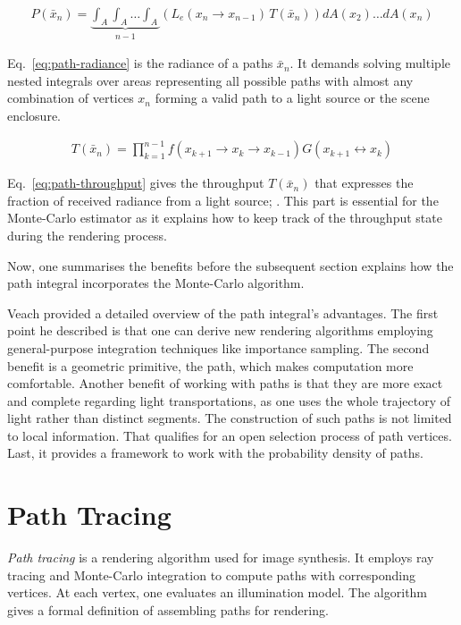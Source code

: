 \begin{align}
P(\bar{x}_n)=\underbrace{\int_A \int_A \dots \int_A}_{n-1}\left(L_e(x_n\rightarrow x_{n-1})\,T(\bar{x}_n) \right)dA(x_2)\dotso dA(x_n)
\label{eq:path-radiance}
\end{align}

Eq.~\ref{eq:path-radiance} is the radiance of a paths $\bar{x}_n$.
It demands solving multiple nested integrals over areas representing all possible paths with almost any combination of vertices $x_n$ forming a valid path to a light source or the scene enclosure.

\begin{align}
T(\bar{x}_n)=\prod_{k=1}^{n-1}f(x_{k+1}\rightarrow x_k\rightarrow x_{k-1})G(x_{k+1}\leftrightarrow x_{k})
\label{eq:path-throughput}
\end{align}

Eq.~\ref{eq:path-throughput} gives the throughput $T(\bar{x}_n)$ that expresses the fraction of received radiance from a light source; \cite{pharr_physically_2017}.
This part is essential for the Monte-Carlo estimator as it explains how to keep track of the throughput state during the rendering process.

Now, one summarises the benefits before the subsequent section explains how the path integral incorporates the Monte-Carlo algorithm.

Veach \cite{veach_robust_1997} provided a detailed overview of the path integral's advantages.
The first point he described is that one can derive new rendering algorithms employing general-purpose integration techniques like importance sampling.
The second benefit is a geometric primitive, the path, which makes computation more comfortable.
Another benefit of working with paths is that they are more exact and complete regarding light transportations, as one uses the whole trajectory of light rather than distinct segments.
The construction of such paths is not limited to local information. 
That qualifies for an open selection process of path vertices.
Last, it provides a framework to work with the probability density of paths.

\section{Path Tracing} \label{sec:path-tracing}

\textit{Path tracing} is a rendering algorithm used for image synthesis.
It employs ray tracing and Monte-Carlo integration to compute paths with corresponding vertices.
At each vertex, one evaluates an illumination model.
The algorithm gives a formal definition of assembling paths for rendering.

